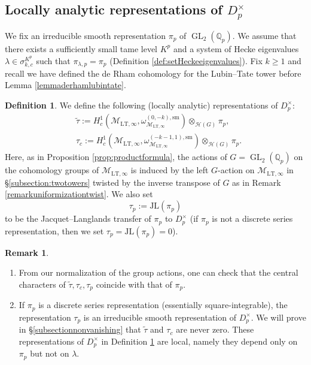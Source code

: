 \documentclass{article}
\theoremstyle{definition}
\newtheorem{definition}[theorem]{Definition}
\newtheorem{remark}[theorem]{Remark}
\def\calH{\mathcal{H}}
\def\calM{\mathcal{M}}
\def\bbQ{\mathbb{Q}}
\DeclareMathOperator{\ox}{\otimes}
\DeclareMathOperator{\GL}{GL}
\def\LT{\mathrm{LT}}
\def\sm{\mathrm{sm}}
\def\tilde{\widetilde}
\begin{document}
\subsection{Locally analytic representations of $D_p^{\times}$}\label{subsec:repofDptimes}
We fix an irreducible smooth representation $\pi_p$ of $\GL_2(\bbQ_p)$. We assume that there exists a sufficiently small tame level $K^p$ and a system of Hecke eigenvalues $\lambda\in \sigma_{k,c}^{K^p}$ such that $\pi_{\lambda,p}=\pi_p$ (Definition \ref{def:setHeckeeigenvalues}). Fix $k\geq 1$ and recall we have defined the de Rham cohomology for the Lubin--Tate tower before Lemma \ref{lemmaderhamlubintate}.
\begin{definition}\label{def:tauc}
We define the following (locally analytic) representations of $D_p^\times$:
\begin{align*}
    &\tilde{\tau}:=H^1_c(\calM_{\LT,\infty},\omega_{\calM_{\LT,\infty}}^{(0,-k),\sm})\ox_{\calH(G)}\pi_p, \\
    &\tau_c :=H^1_c(\calM_{\LT,\infty},\omega_{\calM_{\LT,\infty}}^{(-k-1,1),\sm})\ox_{\calH(G)}\pi_p.
\end{align*}  
Here, as in Proposition \ref{prop:productformula}, the actions of $G=\GL_2(\bbQ_p)$ on the cohomology groups of $\calM_{\LT,\infty}$ is induced by the left $G$-action on $\calM_{\LT,\infty}$ in \S\ref{subsection:twotowers} twisted by the inverse transpose of $G$ as in Remark \ref{remarkuniformizationtwist}. We also set
\[\tau_p:=\mathrm{JL}(\pi_p)\]
to be the Jacquet--Langlands transfer of $\pi_p$ to $D_p^{\times}$ \cite{langlands1970automorphic} (if $\pi_p$ is not a discrete series representation, then we set $\tau_p=\mathrm{JL}(\pi_p)=0$).
\end{definition}
\begin{remark}
    \begin{enumerate}[(1)]
        \item From our normalization of the group actions, one can check that the central characters of $\widetilde{\tau},\tau_c,\tau_p$ coincide with that of $\pi_p$.
        \item If $\pi_p$ is a discrete series representation (essentially square-integrable), the representation $\tau_p$ is an irreducible smooth representation of $D_p^{\times}$. We will prove in \S\ref{subsectionnonvanishing} that $\tilde{\tau}$ and $\tau_c $ are never zero. These representations of $D_p^{\times}$ in Definition \ref{def:tauc} are local, namely they depend only on $\pi_p$ but not on $\lambda$.
    \end{enumerate}
\end{remark}
\end{document}
